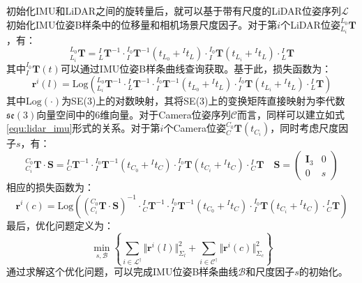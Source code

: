 \label{subsubsec:init_so3_bspline}
初始化IMU和LiDAR之间的旋转量后，就可以基于带有尺度的LiDAR位姿序列$\mathcal{L}$初始化IMU位姿B样条中的位移量和相机场景尺度因子。对于第$i$个LiDAR位姿${{^{L_0}_{L_i}}\boldsymbol{T}}$，有：
\begin{equation}
  \label{equ:lidar_imu}
  {{^{L_0}_{L_i}}\boldsymbol{T}}={{^{I}_{L}}\boldsymbol{T}^{-1}}\cdot{{^{I_0}_{I}}\boldsymbol{T}^{-1}\left( t_{L_0}+{^{I}t_L}\right) }\cdot{{^{I_0}_{I}}\boldsymbol{T}\left( t_{L_i}+{^{I}t_L}\right) }\cdot{{^{I}_{L}}\boldsymbol{T}}
\end{equation}
其中${{^{I_0}_{I}}\boldsymbol{T}(t)}$可以通过IMU位姿B样条曲线查询获取。基于此，损失函数为：
\begin{equation}
  \boldsymbol{r}^i(l)=\mathrm{Log}\left( {{^{L_0}_{L_i}}\boldsymbol{T}^{-1}}\cdot{{^{I}_{L}}\boldsymbol{T}^{-1}}\cdot{{^{I_0}_{I}}\boldsymbol{T}^{-1}\left( t_{L_0}+{^{I}t_L}\right) }\cdot{{^{I_0}_{I}}\boldsymbol{T}\left( t_{L_i}+{^{I}t_L}\right) }\cdot{{^{I}_{L}}\boldsymbol{T}}\right)
\end{equation}
其中$\mathrm{Log}(\cdot)$为SE(3)上的对数映射，其将SE(3)上的变换矩阵直接映射为李代数$\mathfrak{se}(3)$向量空间中的6维向量。对于Camera位姿序列$\mathcal{C}$而言，同样可以建立如式\ref{equ:lidar_imu}形式的关系。对于第$i$个Camera位姿${{^{C_0}_{C}}\boldsymbol{T}(t_{C_i})}$，同时考虑尺度因子$s$，有：
\begin{equation}
  \label{equ:camera_imu}
  {{^{C_0}_{C_i}}\boldsymbol{T}}\cdot\boldsymbol{S}
  ={{^{I}_{C}}\boldsymbol{T}^{-1}}\cdot{{^{I_0}_{I}}\boldsymbol{T}^{-1}\left( t_{C_0}+{^{I}t_C}\right) }\cdot{{^{I_0}_{I}}\boldsymbol{T}\left( t_{C_i}+{^{I}t_C}\right) }\cdot{{^{I}_{C}}\boldsymbol{T}}\quad \boldsymbol{S}=\begin{pmatrix}
    \boldsymbol{I}_{3} & 0 \\0&s
  \end{pmatrix}
\end{equation}
相应的损失函数为：
\begin{equation}
  \boldsymbol{r}^i(c)=\mathrm{Log}\left(\left( {{^{C_0}_{C_i}}\boldsymbol{T}}\cdot\boldsymbol{S}\right) ^{-1}\cdot {{^{I}_{C}}\boldsymbol{T}^{-1}}\cdot{{^{I_0}_{I}}\boldsymbol{T}^{-1}\left( t_{C_0}+{^{I}t_C}\right) }\cdot{{^{I_0}_{I}}\boldsymbol{T}\left( t_{C_i}+{^{I}t_C}\right) }\cdot{{^{I}_{C}}\boldsymbol{T}} \right)
\end{equation}
最后，优化问题定义为：
\begin{equation}
  \min_{s,\mathcal{B}}\left\lbrace \sum_{i\in\mathcal{L}^\dagger}\Vert\boldsymbol{r}^i(l)\Vert^2_{\Sigma_l}+\sum_{i\in\mathcal{C}^\dagger}\Vert\boldsymbol{r}^i(c)\Vert^2_{\Sigma_c} \right\rbrace
\end{equation}
通过求解这个优化问题，可以完成IMU位姿B样条曲线$\mathcal{B}$和尺度因子$s$的初始化。
